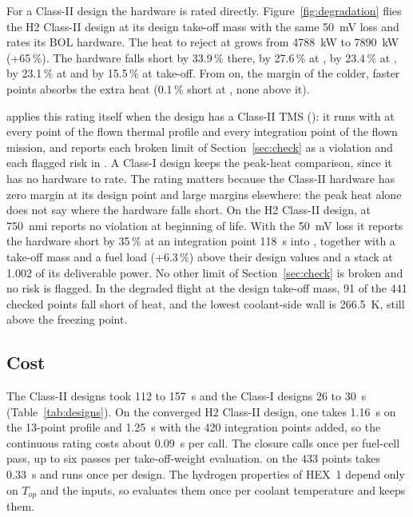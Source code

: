 \documentclass[a4paper,11pt]{article}
\begin{document}
For a Class-II design the hardware is rated directly. Figure~\ref{fig:degradation} flies
the H2 Class-II design at its design take-off mass with the same \SI{50}{mV} loss and rates
its BOL hardware. The heat to reject at  grows from \SI{4788}{kW} to
\SI{7890}{kW} (+65\,\%). The hardware falls short by 33.9\,\% there, by 27.6\,\% at
, by 23.4\,\% at , by 23.1\,\% at
 and by 15.5\,\% at take-off. From  on, the
margin of the colder, faster points absorbs the extra heat (0.1\,\% short at
, none above it).

 applies this rating itself when the design has a Class-II TMS
(): it runs  with  at every
point of the flown thermal profile and every integration point of the flown mission, and
reports each broken limit of Section~\ref{sec:check} as a violation and each flagged risk in
. A Class-I design keeps the peak-heat comparison, since it has
no hardware to rate. The rating matters because the Class-II hardware has zero margin at
its design point and large margins elsewhere: the peak heat alone does not say where the
hardware falls short. On the H2 Class-II design,  at \SI{750}{nmi}
reports no violation at beginning of life. With the \SI{50}{mV} loss it reports the
hardware short by 35\,\% at an integration point \SI{118}{s} into ,
together with a take-off mass and a fuel load (+6.3\,\%) above their design values and a
stack at 1.002 of its deliverable power. No other limit of Section~\ref{sec:check} is broken
and no risk is flagged. In the degraded flight at the design take-off mass, 91 of
the 441 checked points fall short of heat, and the lowest coolant-side wall is
\SI{266.5}{K}, still above the freezing point.

\subsection{Cost}
The Class-II designs took 112 to \SI{157}{s} and the Class-I designs 26 to \SI{30}{s}
(Table~\ref{tab:designs}). On the converged H2 Class-II design, one 
takes \SI{1.16}{s} on the 13-point profile and \SI{1.25}{s} with the 420 integration
points added, so the continuous rating costs about \SI{0.09}{s} per call. The closure calls
 once per fuel-cell pass, up to six passes per take-off-weight
evaluation.  on the 433 points takes \SI{0.33}{s} and runs once per
design. The hydrogen properties of HEX~1 depend only on $T_{op}$ and the inputs, so
 evaluates them once per coolant temperature and keeps them.
\end{document}
